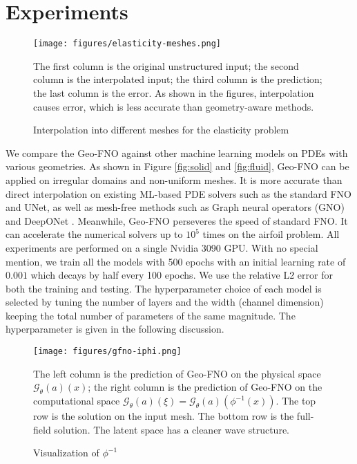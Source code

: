 \documentclass{article}
\newcommand{\G}{\mathcal{G}}
\begin{document}
\section{Experiments}

\begin{figure}
    \centering
    \texttt{[image: figures/elasticity-meshes.png]}
    \caption{Interpolation into different meshes for the elasticity problem}
    \label{fig:meshes}
    {\small  
    The first column is the original unstructured input; the second column is the interpolated input; the third column is the prediction; the last column is the error. As shown in the figures, interpolation causes error, which is less accurate than geometry-aware methods.} 
\end{figure}

We compare the Geo-FNO against other machine learning models on PDEs with various geometries. As shown in Figure \ref{fig:solid} and \ref{fig:fluid}, Geo-FNO can be applied on irregular domains and non-uniform meshes. It is more accurate than direct interpolation on existing ML-based PDE solvers such as the standard FNO\citep{li2020fourier} and UNet\citep{ronneberger2015u}, as well as mesh-free methods such as Graph neural operators (GNO) \citep{li2020neural} and DeepONet \citep{lu2019deeponet}. Meanwhile, Geo-FNO perseveres the speed of standard FNO. It can accelerate the numerical solvers up to $10^5$ times on the airfoil problem. All experiments are performed on a single Nvidia 3090 GPU. With no special mention, we train all the models with 500 epochs with an initial learning rate of $0.001$ which decays by half every 100 epochs. We use the relative L2 error for both the training and testing. The hyperparameter choice of each model is selected by tuning the number of layers and the width (channel dimension) keeping the total number of parameters of the same magnitude. The hyperparameter is given in the following discussion.

\begin{figure}[t]
    \centering
    \texttt{[image: figures/gfno-iphi.png]}
    \caption{Visualization of $\phi^{-1}$}
    \label{fig:iphi}
    {\small The left column is the prediction of Geo-FNO on the physical space $\G_\theta(a)(x)$; the right column is the prediction of Geo-FNO on the computational space $\G_\theta(a)(\xi) = \G_\theta(a)(\phi^{-1}(x))$. The top row is the solution on the input mesh. The bottom row is the full-field solution. The latent space has a cleaner wave structure.}
\end{figure}
\end{document}
